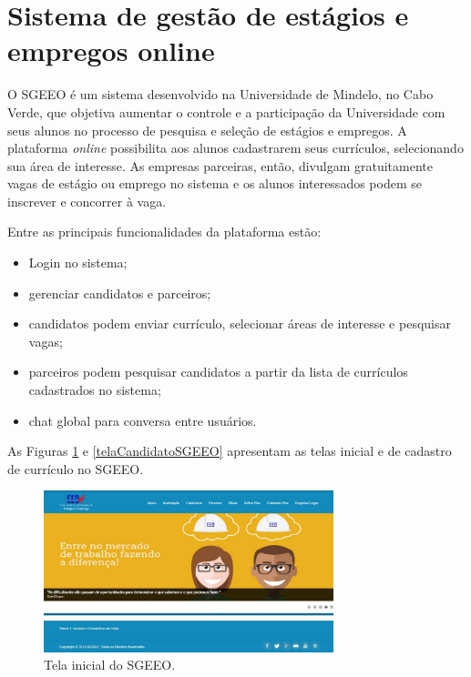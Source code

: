 \section{Sistema de gestão de estágios e empregos online}
\label{trabRelSistEmprego}

O SGEEO \cite{SGEEOMono} é um sistema desenvolvido na Universidade de Mindelo, no Cabo Verde, que objetiva aumentar o controle e a participação da Universidade com seus alunos no processo de pesquisa e seleção de estágios e empregos. A plataforma \textit{online} possibilita aos alunos cadastrarem seus currículos, selecionando sua área de interesse. As empresas parceiras, então, divulgam gratuitamente vagas de estágio ou emprego no sistema e os alunos interessados podem se inscrever e concorrer à vaga.

Entre as principais funcionalidades da plataforma estão:

\begin{itemize}
    \item Login no sistema;
    \item gerenciar candidatos e parceiros;
    \item candidatos podem enviar currículo, selecionar áreas de interesse e pesquisar vagas;
    \item parceiros podem pesquisar candidatos a partir da lista de currículos cadastrados no sistema;
    \item chat global para conversa entre usuários.
\end{itemize}

As Figuras \ref{telaHomeSGEEO} e \ref{telaCandidatoSGEEO} apresentam as telas inicial e de cadastro de currículo no SGEEO.

\begin{figure}[H]
    \caption{Tela inicial do SGEEO.}
       	\begin{center}
            \includegraphics[width=0.75\textwidth]{figuras/rel01.png}
        \end{center}
    \label{telaHomeSGEEO}
\end{figure}

